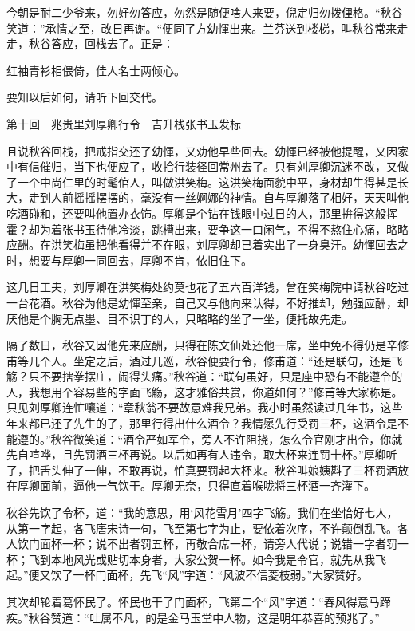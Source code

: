 \documentclass[12pt,UTF8]{ctexbook}
\begin{document}
{{{今朝是耐二少爷来，勿好勿答应，勿然是随便啥人来要，倪定归勿拨俚格。“秋谷笑道：”承情之至，改日再谢。“便同了方幼惲出来。兰芬送到楼梯，叫秋谷常来走走，秋谷答应，回栈去了。正是：

红袖青衫相偎倚，佳人名士两倾心。

要知以后如何，请听下回交代。





第十回　兆贵里刘厚卿行令　吉升栈张书玉发标





且说秋谷回栈，把戒指交还了幼惲，又劝他早些回去。幼惲已经被他提醒，又因家中有信催归，当下也便应了，收拾行装径回常州去了。只有刘厚卿沉迷不改，又做了一个中尚仁里的时髦倌人，叫做洪笑梅。这洪笑梅面貌中平，身材却生得甚是长大，走到人前摇摇摆摆的，毫没有一丝婀娜的神情。自与厚卿落了相好，天天叫他吃酒碰和，还要叫他置办衣饰。厚卿是个钻在钱眼中过日的人，那里拚得这般挥霍？却为着张书玉待他冷淡，跳槽出来，要争这一口闲气，不得不熬住心痛，略略应酬。在洪笑梅虽把他看得并不在眼，刘厚卿却已着实出了一身臭汗。幼惲回去之时，想要与厚卿一同回去，厚卿不肯，依旧住下。

这几日工夫，刘厚卿在洪笑梅处约莫也花了五六百洋钱，曾在笑梅院中请秋谷吃过一台花酒。秋谷为他是幼惲至亲，自己又与他向来认得，不好推却，勉强应酬，却厌他是个胸无点墨、目不识丁的人，只略略的坐了一坐，便托故先走。

隔了数日，秋谷又因他先来应酬，只得在陈文仙处还他一席，坐中免不得仍是辛修甫等几个人。坐定之后，酒过几巡，秋谷便要行令，修甫道：“还是联句，还是飞觞？只不要搳拳摆庄，闹得头痛。”秋谷道：“联句虽好，只是座中恐有不能遵令的人，我想用个容易些的字面飞觞，这才雅俗共赏，你道如何？”修甫等大家称是。只见刘厚卿连忙嚷道：“章秋翁不要故意难我兄弟。我小时虽然读过几年书，这些年来都已还了先生的了，那里行得出什么酒令？我情愿先行受罚三杯，这酒令是不能遵的。”秋谷微笑道：“酒令严如军令，旁人不许阻挠，怎么令官刚才出令，你就先自喧哗，且先罚酒三杯再说。以后如再有人违令，取大杯来连罚十杯。”厚卿听了，把舌头伸了一伸，不敢再说，怕真要罚起大杯来。秋谷叫娘姨斟了三杯罚酒放在厚卿面前，逼他一气饮干。厚卿无奈，只得直着喉咙将三杯酒一齐灌下。

秋谷先饮了令杯，道：“我的意思，用‘风花雪月’四字飞觞。我们在坐恰好七人，从第一字起，各飞唐宋诗一句，飞至第七字为止，要依着次序，不许颠倒乱飞。各人饮门面杯一杯；说不出者罚五杯，再敬合席一杯，请旁人代说；说错一字者罚一杯；飞到本地风光或贴切本身者，大家公贺一杯。如今我是令官，就先从我飞起。”便又饮了一杯门面杯，先飞“风”字道：“风波不信菱枝弱。”大家赞好。

其次却轮着葛怀民了。怀民也干了门面杯，飞第二个“风”字道：“春风得意马蹄疾。”秋谷赞道：“吐属不凡，的是金马玉堂中人物，这是明年恭喜的预兆了。”

}}}
\end{document}
